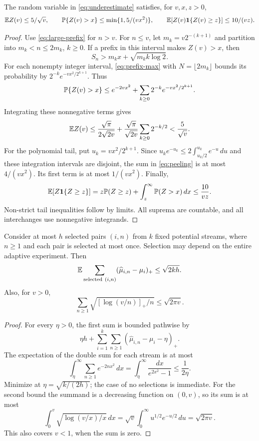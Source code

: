 \begin{lemma}\label{lem:Z}
The random variable in \eqref{eq:underestimate} satisfies, for $v,x,z>0$,
\[
 \mathbb E Z(v)\le5/\sqrt v,\qquad
 \mathbb P\{Z(v)>x\}\le\min\{1,5/(vx^2)\},\qquad
 \mathbb E[Z(v)\mathbf 1\{Z(v)\ge z\}]\le10/(vz).
\]
\end{lemma}
\begin{proof}
Use \eqref{eq:large-prefix} for $n>v$. For $n\le v$, let $m_k=v2^{-(k+1)}$ and partition into $m_k<n\le2m_k$, $k\ge0$. If a prefix in this interval makes $Z(v)>x$, then
\[
 S_n>m_kx+\sqrt{m_k k\log2}.
\]
For each nonempty integer interval, \eqref{eq:prefix-max} with $N=\lfloor2m_k\rfloor$ bounds its probability by $2^{-k}e^{-vx^2/2^{k+1}}$. Thus
\begin{equation}\label{eq:peeling}
 \mathbb P\{Z(v)>x\}\le e^{-2vx^2}+\sum_{k\ge0}2^{-k}e^{-vx^2/2^{k+1}}.
\end{equation}
Integrating these nonnegative terms gives
\[
 \mathbb E Z(v)\le\frac{\sqrt\pi}{2\sqrt{2v}}
 +\frac{\sqrt\pi}{\sqrt{2v}}\sum_{k\ge0}2^{-k/2}<\frac5{\sqrt v}.
\]
For the polynomial tail, put $u_k=vx^2/2^{k+1}$. Since $u_ke^{-u_k}\le2\int_{u_k/2}^{u_k}e^{-u}\,du$ and these integration intervals are disjoint, the sum in \eqref{eq:peeling} is at most $4/(vx^2)$. Its first term is at most $1/(vx^2)$. Finally,
\[
 \mathbb E[Z\mathbf 1\{Z\ge z\}]
 =z\mathbb P(Z\ge z)+\int_z^\infty\mathbb P(Z>x)\,dx\le\frac{10}{vz}.
\]
Non-strict tail inequalities follow by limits. All suprema are countable, and all interchanges use nonnegative integrands.
\end{proof}

\begin{lemma}\label{lem:distinct}
Consider at most $h$ selected pairs $(i,n)$ from $k$ fixed potential streams, where $n\ge1$ and each pair is selected at most once. Selection may depend on the entire adaptive experiment. Then
\[
 \EE\sum_{\mathrm{selected}\ (i,n)}(\widehat\mu_{i,n}-\mu_i)_+\le\sqrt{2kh}.
\]
Also, for $v>0$,
\[
 \sum_{n\ge1}\sqrt{[\log(v/n)]_+/n}\le\sqrt{2\pi v}.
\]
\end{lemma}
\begin{proof}
For every $\eta>0$, the first sum is bounded pathwise by
\[
 \eta h+\sum_{i=1}^k\sum_{n\ge1}(\widehat\mu_{i,n}-\mu_i-\eta)_+.
\]
The expectation of the double sum for each stream is at most
\[
 \int_\eta^\infty\sum_{n\ge1}e^{-2nx^2}\,dx
 =\int_\eta^\infty\frac{dx}{e^{2x^2}-1}\le\frac1{2\eta}.
\]
Minimize at $\eta=\sqrt{k/(2h)}$; the case of no selections is immediate. For the second bound the summand is a decreasing function on $(0,v)$, so its sum is at most
\[
 \int_0^v\sqrt{\log(v/x)/x}\,dx
 =\sqrt v\int_0^\infty u^{1/2}e^{-u/2}\,du=\sqrt{2\pi v}.
\]
This also covers $v<1$, when the sum is zero.
\end{proof}

